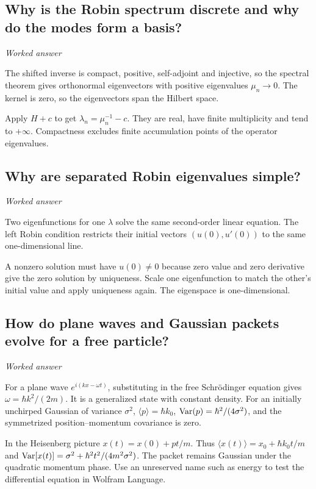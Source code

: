 \documentclass[11pt]{article}
\begin{document}
\subsection{Why is the Robin spectrum discrete and why do the modes form a basis?}
\label{problem:robin-eigenbasis}
\textit{Worked answer}

The shifted inverse is compact, positive, self-adjoint and injective, so the spectral theorem gives orthonormal eigenvectors with positive eigenvalues \(\mu_n\to0\). The kernel is zero, so the eigenvectors span the Hilbert space.

Apply \(H+c\) to get \(\lambda_n=\mu_n^{-1}-c\). They are real, have finite multiplicity and tend to \(+\infty\). Compactness excludes finite accumulation points of the operator eigenvalues.

\subsection{Why are separated Robin eigenvalues simple?}
\label{problem:robin-simple}
\textit{Worked answer}

Two eigenfunctions for one \(\lambda\) solve the same second-order linear equation. The left Robin condition restricts their initial vectors \((u(0),u'(0))\) to the same one-dimensional line.

A nonzero solution must have \(u(0)\ne0\) because zero value and zero derivative give the zero solution by uniqueness. Scale one eigenfunction to match the other's initial value and apply uniqueness again. The eigenspace is one-dimensional.

\subsection{How do plane waves and Gaussian packets evolve for a free particle?}
\label{problem:free-wave}
\textit{Worked answer}

For a plane wave \(e^{i(kx-\omega t)}\), substituting in the free Schr\"{o}dinger equation gives \(\omega=\hbar k^2/(2m)\). It is a generalized state with constant density. For an initially unchirped Gaussian of variance \(\sigma^2\), \(\langle p\rangle=\hbar k_0\), \({\rm Var}(p)=\hbar^2/(4\sigma^2)\), and the symmetrized position--momentum covariance is zero.

In the Heisenberg picture \(x(t)=x(0)+pt/m\). Thus \(\langle x(t)\rangle=x_0+\hbar k_0t/m\) and \({\rm Var}[x(t)]=\sigma^2+\hbar^2t^2/(4m^2\sigma^2)\). The packet remains Gaussian under the quadratic momentum phase. Use an unreserved name such as energy to test the differential equation in Wolfram Language.
\end{document}
